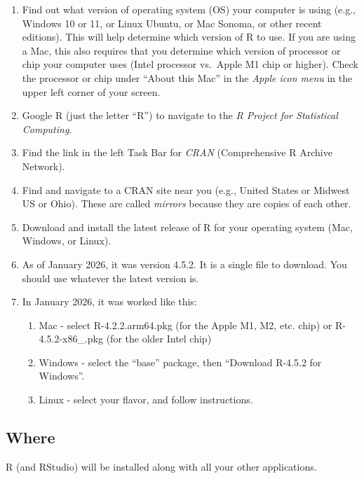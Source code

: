 \documentclass[
  letterpaper,
  DIV=11,
  numbers=noendperiod]{scrreprt}
\providecommand{\tightlist}{%
  \setlength{\itemsep}{0pt}\setlength{\parskip}{0pt}}
\begin{document}
\begin{enumerate}
\def\labelenumi{\arabic{enumi}.}
\tightlist
\item
  Find out what version of operating system (OS) your computer is using
  (e.g., Windows 10 or 11, or Linux Ubuntu, or Mac Sonoma, or other
  recent editions). This will help determine which version of R to use.
  If you are using a Mac, this also requires that you determine which
  version of processor or chip your computer uses (Intel processor
  vs.~Apple M1 chip or higher). Check the processor or chip under
  ``About this Mac'' in the \emph{Apple icon menu} in the upper left
  corner of your screen.
\item
  Google R (just the letter ``R'') to navigate to the \emph{R Project
  for Statistical Computing}.
\item
  Find the link in the left Task Bar for \emph{CRAN} (Comprehensive R
  Archive Network).
\item
  Find and navigate to a CRAN site near you (e.g., United States or
  Midwest US or Ohio). These are called \emph{mirrors} because they are
  copies of each other.
\item
  Download and install the latest release of R for your operating system
  (Mac, Windows, or Linux).
\item
  As of January 2026, it was version 4.5.2. It is a single file to
  download. You should use whatever the latest version is.
\item
  In January 2026, it was worked like this:

  \begin{enumerate}
  \def\labelenumii{\alph{enumii}.}
  \tightlist
  \item
    Mac - select R-4.2.2.arm64.pkg (for the Apple M1, M2, etc. chip) or
    R-4.5.2-x86\_.pkg (for the older Intel chip)
  \item
    Windows - select the ``base'' package, then ``Download R-4.5.2 for
    Windows''.
  \item
    Linux - select your flavor, and follow instructions.
  \end{enumerate}
\end{enumerate}

\subsection{Where}\label{where}

R (and RStudio) will be installed along with all your other
applications.
\end{document}
